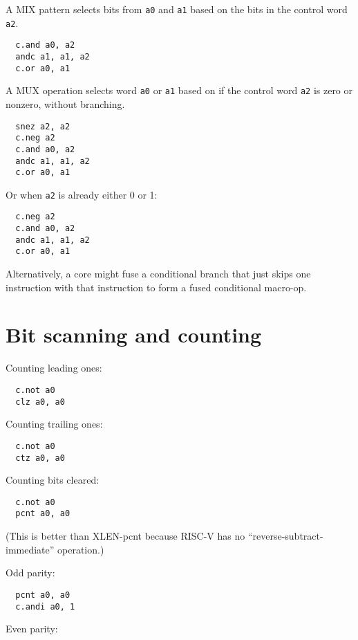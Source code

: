 A MIX pattern selects bits from {\tt a0} and {\tt a1} based on the bits in
the control word {\tt a2}.

\begin{verbatim}
  c.and a0, a2
  andc a1, a1, a2
  c.or a0, a1
\end{verbatim}

A MUX operation selects word {\tt a0} or {\tt a1} based on if the control
word {\tt a2} is zero or nonzero, without branching.

\begin{verbatim}
  snez a2, a2
  c.neg a2
  c.and a0, a2
  andc a1, a1, a2
  c.or a0, a1
\end{verbatim}

Or when {\tt a2} is already either 0 or 1:

\begin{verbatim}
  c.neg a2
  c.and a0, a2
  andc a1, a1, a2
  c.or a0, a1
\end{verbatim}

Alternatively, a core might fuse a conditional branch that just skips one
instruction with that instruction to form a fused conditional macro-op.

\section{Bit scanning and counting}

Counting leading ones:

\begin{verbatim}
  c.not a0
  clz a0, a0
\end{verbatim}

Counting trailing ones:

\begin{verbatim}
  c.not a0
  ctz a0, a0
\end{verbatim}

Counting bits cleared:

\begin{verbatim}
  c.not a0
  pcnt a0, a0
\end{verbatim}

(This is better than XLEN-pcnt because RISC-V has no ``reverse-subtract-immediate'' operation.)

Odd parity:

\begin{verbatim}
  pcnt a0, a0
  c.andi a0, 1
\end{verbatim}

Even parity:

